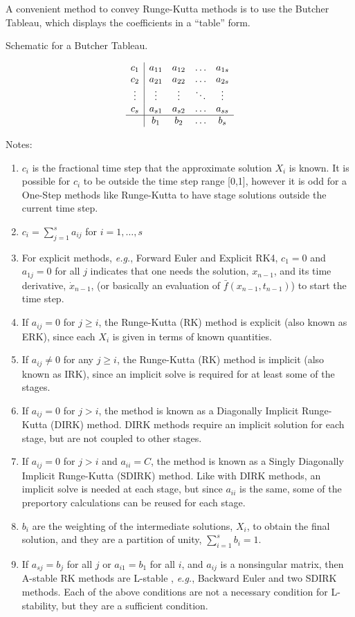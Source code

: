 A convenient method to convey Runge-Kutta methods is to use the Butcher
Tableau, which displays the coefficients in a ``table'' form.
\begin{table}[H]
\caption{Schematic for a Butcher Tableau.\label{rythmos:tab:SchematicButcherTableau}}
\[
\begin{array}{c|cccc}
c_{1} & a_{11} & a_{12} & \ldots & a_{1s}\\
c_{2} & a_{21} & a_{22} & \ldots & a_{2s}\\
\vdots & \vdots & \vdots & \ddots & \vdots\\
c_{s} & a_{s1} & a_{s2} & \ldots & a_{ss}\\
\hline  & b_{1} & b_{2} & \ldots & b_{s}
\end{array}
\]
\end{table}
Notes:
\begin{enumerate}
\item $c_{i}$ is the fractional time step that the approximate solution
$X_{i}$ is known. It is possible for $c_{i}$ to be outside the time
step range {[}0,1{]}, however it is odd for a One-Step methods like
Runge-Kutta to have stage solutions outside the current time step. 
\item $c_{i}=\sum_{j=1}^{s}a_{ij}$ for $i=1,\ldots,s$
\item For explicit methods, \emph{e.g.}, Forward Euler and Explicit RK4,
$c_{1}=0$ and $a_{1j}=0$ for all $j$ indicates that one needs the
solution, $x_{n-1}$, and its time derivative, $\dot{x}_{n-1}$, (or
basically an evaluation of $\bar{f}(x_{n-1},t_{n-1})$) to start the
time step.
\item If $a_{ij}=0$ for $j\ge i$, the Runge-Kutta (RK) method is explicit
(also known as ERK), since each $X_{i}$ is given in terms of known
quantities.
\item If $a_{ij}\ne0$ for any $j\ge i$, the Runge-Kutta (RK) method is
implicit (also known as IRK), since an implicit solve is required
for at least some of the stages.
\item If $a_{ij}=0$ for $j>i$, the method is known as a Diagonally Implicit
Runge-Kutta (DIRK) method. DIRK methods require an implicit solution
for each stage, but are not coupled to other stages.
\item If $a_{ij}=0$ for $j>i$ and $a_{ii}=C$, the method is known as
a Singly Diagonally Implicit Runge-Kutta (SDIRK) method. Like with
DIRK methods, an implicit solve is needed at each stage, but since
$a_{ii}$ is the same, some of the preportory calculations can be
reused for each stage.
\item $b_{i}$ are the weighting of the intermediate solutions, $X_{i}$,
to obtain the final solution, and they are a partition of unity, $\sum_{i=1}^{s}b_{i}=1$.
\item If $a_{sj}=b_{j}$ for all $j$ or $a_{i1}=b_{1}$ for all $i$, and
$a_{ij}$ is a nonsingular matrix, then A-stable RK methods are L-stable
\cite[p. 45]{HairerWanner}\cite[p. 103]{AscherPetzold}, \emph{e.g.},
Backward Euler and two SDIRK methods. Each of the above conditions
are not a necessary condition for L-stability, but they are a sufficient
condition.
\end{enumerate}

